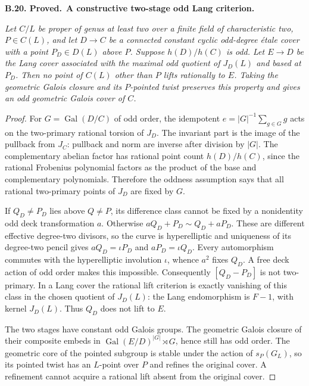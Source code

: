 \documentclass[11pt,a4paper]{article}
\newenvironment{claim}[3]{\par\medskip\noindent\hypertarget{#1}{\textbf{#1. #2.}}\ \textbf{#3.}\par\nopagebreak\smallskip\begingroup\itshape}{\endgroup\par\smallskip}
\begin{document}
\begin{claim}{B.20}{Proved}{A constructive two-stage odd Lang criterion}
Let $C/L$ be proper of genus at least two over a finite field of
characteristic two, $P\in C(L)$, and let $D\to C$ be a connected
constant cyclic odd-degree \emph{\'etale} cover with a point
$P_D\in D(L)$ above $P$. Suppose $h(D)/h(C)$ is odd.
Let $E\to D$ be the Lang cover associated with the maximal odd
quotient of $J_D(L)$ and based at $P_D$. Then no point of $C(L)$
other than $P$ lifts rationally to $E$. Taking the geometric
Galois closure and its $P$-pointed twist preserves this property
and gives an odd geometric Galois cover of $C$.
\end{claim}
\begin{proof}
For $G=\operatorname{Gal}(D/C)$ of odd order, the idempotent
$e=|G|^{-1}\sum_{g\in G}g$ acts on the two-primary rational torsion
of $J_D$. The invariant part is the image of the pullback from
$J_C$: pullback and norm are inverse after division by $|G|$.
The complementary abelian factor has rational point count
$h(D)/h(C)$, since the rational Frobenius polynomial factors as
the product of the base and complementary polynomials. Therefore
the oddness assumption says that all rational two-primary points
of $J_D$ are fixed by $G$.

If $Q_D\ne P_D$ lies above $Q\ne P$, its difference class cannot be
fixed by a nonidentity odd deck transformation $a$. Otherwise
$aQ_D+P_D\sim Q_D+aP_D$. These are different effective degree-two
divisors, so the curve is hyperelliptic and uniqueness of its
degree-two pencil gives $aQ_D=\iota P_D$ and $aP_D=\iota Q_D$.
Every automorphism commutes with the hyperelliptic involution
$\iota$, whence $a^2$ fixes $Q_D$. A free deck action of odd order
makes this impossible. Consequently $[Q_D-P_D]$ is not
two-primary. In a Lang cover the rational lift criterion is
exactly vanishing of this class in the chosen quotient of
$J_D(L)$: the Lang endomorphism is $F-1$, with kernel $J_D(L)$.
Thus $Q_D$ does not lift to $E$.

The two stages have constant odd Galois groups. The geometric
Galois closure of their composite embeds in
$\operatorname{Gal}(E/D)^{|G|}\rtimes G$, hence still has odd order.
The geometric core of the pointed subgroup is stable under the
action of $s_P(G_L)$, so its pointed twist has an $L$-point over
$P$ and refines the original cover. A refinement cannot acquire
a rational lift absent from the original cover.
\end{proof}
\end{document}
